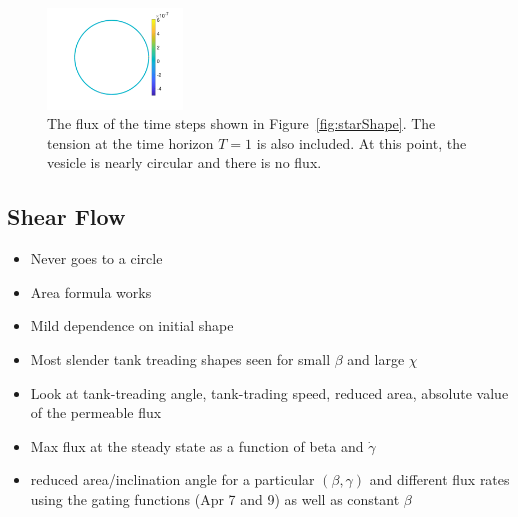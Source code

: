 \documentclass[aps,prl,showpacs]{revtex4}
\begin{document}
\begin{figure}[htp]
\begin{minipage}{0.55\textwidth}
\includegraphics[width=0.32\textwidth]{figures/StarFluxTime6.pdf}
\end{minipage}
  \caption{\label{fig:starFlux} The flux of the time steps shown in
  Figure~\ref{fig:starShape}. The tension at the time horizon $T=1$ is
  also included. At this point, the vesicle is nearly circular and there
  is no flux.}
\end{figure}

%  



\subsection{Shear Flow}
\begin{itemize}
  \item Never goes to a circle
  \item Area formula works
  \item Mild dependence on initial shape
  \item Most slender tank treading shapes seen for small $\beta$ and
    large $\chi$

  \item Look at tank-treading angle, tank-trading speed, reduced area,
    absolute value of the permeable flux
  \item Max flux at the steady state as a function of beta and
    $\dot{\gamma}$

  \item reduced area/inclination angle for a particular $(\beta,\gamma)$
    and different flux rates using the gating functions (Apr 7 and 9) as
    well as constant $\beta$
\end{itemize}
\end{document}
